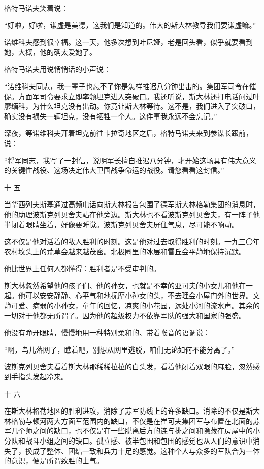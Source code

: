 格特马诺夫笑着说：

“好啦，好啦，谦虚是美德，这我们是知道的。伟大的斯大林教导我们要谦虚嘛。”

诺维科夫感到很幸福。这一天，他多次想到叶尼娅，老是回头看，似乎就要看到她，大概，他的确太爱她了。

格特马诺夫用说悄悄话的小声说：

“诺维科夫同志，我一辈子也忘不了你是怎样推迟八分钟出击的。集团军司令在催促。方面军司令要求立即率领坦克进入突破口。我还听说，斯大林还打电话问过叶廖缅科，为什么坦克没有出动。你竟让斯大林等待。这不是，我们进入了突破口，确实没有损失一辆坦克，没有牺牲一个人。这件事我永远不会忘记。”

深夜，等诺维科夫开着坦克前往卡拉奇地区之后，格特马诺夫来到参谋长跟前，说：

“将军同志，我写了一封信，说明军长擅自推迟八分钟，才开始这场具有伟大意义的关键性战役、这场决定伟大卫国战争命运的战役。请您看看这封信。”

十 五

当华西列夫斯基通过高频电话向斯大林报告包围了德军斯大林格勒集团的消息时，他的助理波斯克列贝舍夫站在他旁边。斯大林也不看波斯克列贝舍夫，有一阵子他半闭着眼睛坐着，好像要睡觉。波斯克列贝舍夫屏住气息，尽可能不响动。

这不仅是他对活着的敌人胜利的时刻。这是他对过去取得胜利的时刻。一九三〇年农村坟头上的荒草会越来越茂密。北极圈里的冰层和雪丘会平静地保持沉默。

他比世界上任何人都懂得：胜利者是不受审判的。

斯大林忽然希望他的孩子们、他的孙女，也就是不幸的亚可夫的小女儿和他在一起。他可以安安静静、心平气和地抚摩小孙女的头，不去理会小屋门外的世界。文静可爱、病弱的小孙女，童年的回忆，凉爽的小花园，远处小河的流水声。其余的一切对于他都无所谓了。因为他的超级权力不依靠军队的强大和国家的强盛。

他没有睁开眼睛，慢慢地用一种特别柔和的、带着喉音的语调说：

“啊，鸟儿落网了，瞧着吧，别想从网里逃脱，咱们无论如何不能分离了。”

波斯克列贝舍夫看着斯大林那稀稀拉拉的白头发，看着他闭着双眼的麻脸，忽然感到手指头发起冷来。

十 六

在斯大林格勒地区的胜利进攻，消除了苏军防线上的许多缺口。消除的不仅是斯大林格勒与顿河两大方面军范围内的缺口，不仅是在崔可夫集团军与布置在北面的苏军几个师之间的缺口，也不仅是在一些脱离后方的连与排之间和隐藏在房屋中的小分队和战斗小组之间的缺口。孤立感、被半包围和包围的感觉也从人们的意识中消失了，换成了整体、团结一致和兵力十足的感觉。这种个人与众多的军队合为一体的意识，便是所谓致胜的士气。


